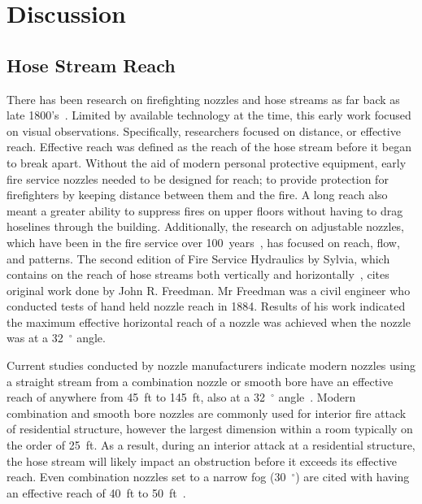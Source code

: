 \documentclass[12pt,oneside]{book}
\begin{document}
\chapter{Discussion}

\section{Hose Stream Reach}
\label{sec:hose_reach}
There has been research on firefighting nozzles and hose streams as far back as late 1800's~\cite{CHICAGO_TRIBUNE:1339:a}. Limited by available technology at the time, this early work focused on visual observations. Specifically, researchers focused on distance, or effective reach. Effective reach was defined as the reach of the hose stream before it began to break apart. Without the aid of modern personal protective equipment, early fire service nozzles needed to be designed for reach; to provide protection for firefighters by keeping distance between them and the fire. A long reach also meant a greater ability to suppress fires on upper floors without having to drag hoselines through the building. Additionally, the research on adjustable nozzles, which have been in the fire service over 100~years~\cite{PALMER:1878}, has focused on reach, flow, and patterns. The second edition of Fire Service Hydraulics by Sylvia, which contains on the reach of hose streams both vertically and horizontally~\cite{SYLVIA:1970}, cites original work done by John R. Freedman. Mr Freedman was a civil engineer who conducted tests of hand held nozzle reach in 1884. Results of his work indicated the maximum effective horizontal reach of a nozzle was achieved when the nozzle was at a 32~$^\circ$ angle. 


Current studies conducted by nozzle manufacturers indicate modern nozzles using a straight stream from a combination nozzle or smooth bore have an effective reach of anywhere from 45~ft to 145~ft, also at a 32~$^\circ$ angle~\cite{TFT_Reach,Elkhart_Reach,Akron_Reach}. Modern combination and smooth bore nozzles are commonly used for interior fire attack of residential structure, however the largest dimension within a room typically on the order of 25~ft. As a result, during an interior attack at a residential structure, the hose stream will likely impact an obstruction before it exceeds its effective reach. Even combination nozzles set to a narrow fog (30~$^\circ$) are cited with having an effective reach of 40~ft to 50~ft~\cite{Elkhart_Reach}.
\end{document}
